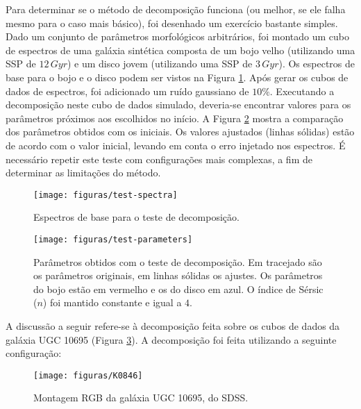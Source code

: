 Para determinar se o método de decomposição funciona (ou melhor, se ele falha
mesmo para o caso mais básico), foi desenhado um exercício bastante simples.
Dado um conjunto de parâmetros morfológicos arbitrários, foi montado um cubo de
espectros de uma galáxia sintética composta de um bojo velho (utilizando uma SSP
de $12\,Gyr$) e um disco jovem (utilizando uma SSP de $3\,Gyr$). Os espectros de
base para o bojo e o disco podem ser vistos na Figura \ref{fig:testSpectra}.
Após gerar os cubos de dados de espectros, foi adicionado um ruído gaussiano de
$10\%$. Executando a decomposição neste cubo de dados simulado, deveria-se
encontrar valores para os parâmetros próximos aos escolhidos no início. A Figura
\ref{fig:testParameters} mostra a comparação dos parâmetros obtidos com os
iniciais. Os valores ajustados (linhas sólidas) estão de acordo com o valor
inicial, levando em conta o erro injetado nos espectros. É necessário repetir
este teste com configurações mais complexas, a fim de determinar as limitações
do método.


\begin{figure}
	\texttt{[image: figuras/test-spectra]}
	\caption[Espectros de base para o teste de decomposição] {Espectros de base
	para o teste de decomposição.}
	\label{fig:testSpectra}
\end{figure}


\begin{figure}
	\texttt{[image: figuras/test-parameters]}
	\caption[Parâmetros obtidos com o teste de decomposição] {Parâmetros obtidos
	com o teste de decomposição. Em tracejado são os parâmetros originais, em
	linhas sólidas os ajustes. Os parâmetros do bojo estão em vermelho e os do
	disco em azul. O índice de Sérsic ($n$) foi mantido constante e igual a $4$.}
	\label{fig:testParameters}
\end{figure}

A discussão a seguir refere-se à decomposição feita sobre os cubos de dados da
galáxia UGC 10695 (Figura \ref{fig:decompTarget}). A decomposição foi feita
utilizando a seguinte configuração:

\begin{figure}
	\texttt{[image: figuras/K0846]}
	\caption[Montagem RGB da galáxia UGC 10695, do SDSS] {Montagem RGB da galáxia 
	UGC 10695, do SDSS.}
	\label{fig:decompTarget}
\end{figure}

